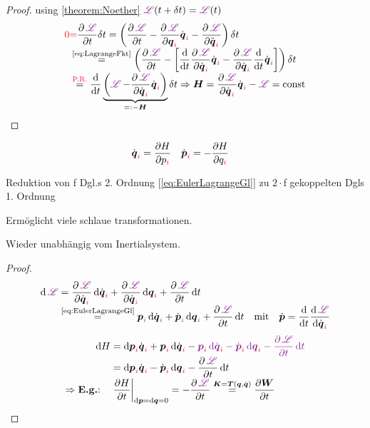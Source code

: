 \begin{proofbox}\nospacing
  \begin{proof} using \cref{theorem:Noether} $\LT(t+\delta t)=\LT(t)$
    \begin{align*}
      \rd{0}&\rd{=}\pfrac{\LT}{t}\delta t=\left(\pfrac{\LT}{t}-\pfrac{\LT}{\qvi}\qdvi-\pfrac{\LT}{\ddot{\qv}_{\idxi}}\right)\delta t\nalign
      &\stackrel{\text{\cref{eq:LagrangeFkt}}}{=}\left(\pfrac{\LT}{t}-\left[\difft\pfrac{\LT}{\qdvi}\qdvi-\pfrac{\LT}{\qdvi}\difft\qdvi\right]\right)\delta t\nalign
      &\stackrel{\text{\rd{P.R.}}}{=}\difft\underbrace{\left(\LT-\pfrac{\LT}{\qdvi}\qdvi\right)}_{=:-\vec{H}}\delta
        t\Rightarrow\vec{H}=\pfrac{\LT}{\qdvi}\qdvi-\LT=\text{const}
    \end{align*}
  \end{proof}
\end{proofbox}
\begin{defnbox}\nospacing
  \begin{defn}
    \begin{align}
      &\dot{\vec{q}}_{\idxi}=\frac{\partial H}{\partial p_{\idxi}}&&
      \dot{\vec{p}}_{\idxi}=-\frac{\partial H}{\partial q_{\idxi}}
    \end{align}
  \end{defn}
\end{defnbox}
\begin{notebox}[Bemerkung]
  \begin{numberlist}
      \item Reduktion von f Dgl.s 2. Ordnung [\cref{eq:EulerLagrangeGl}] zu $2\cdot$f gekoppelten Dgls 1. Ordnung
      \item Ermöglicht viele schlaue transformationen.
      \item Wieder unabhängig vom Inertialsystem.
  \end{numberlist}
\end{notebox}
\begin{proofbox}\nospacing
  \begin{proof}
    \begin{align*}
      \diff\LT&=\pfrac{\LT}{\dot{\vec{q}}_{\idxi}}\diff\qdvi+\pfrac{\LT}{\dot{\vec{q}}_{\idxi}}\diff\qvi+\pfrac{\LT}{t}\diff
                t\nalign 
      &\stackrel{\text{\cref{eq:EulerLagrangeGl}}}{=}\pvi\diff\qdvi+\pdvi\diff\qvi+\pfrac{\LT}{t}\diff t
      &\text{mit}&&\pdv=\difft\frac{\diff\LT}{\diff\qdvi}
    \end{align*}
    \begin{align*}
      \diff H&=\diff\pvi\qdvi+\pvi\diff\qdvi-\textcolor{Fuchsia}{\pvi\diff\qdvi-\pdvi\diff\qvi-\pfrac{\LT}{t}\diff
               t}\nalign
               &=\diff\pvi\qdvi-\pdvi\diff\qvi-\pfrac{\LT}{t}\diff t\nalign
                 \Rightarrow\text{\imp{E.g.}:}\quad&\left.\pfrac{H}{t}\right\rvert_{\diff \pv=\diff \qv=0}=-\pfrac{\LT}{t}\stackrel{\vec{K}=\vec{T}(\qv,\qdv)}{=}\pfrac{\vec{W}}{t}
    \end{align*}
  \end{proof}
\end{proofbox}

